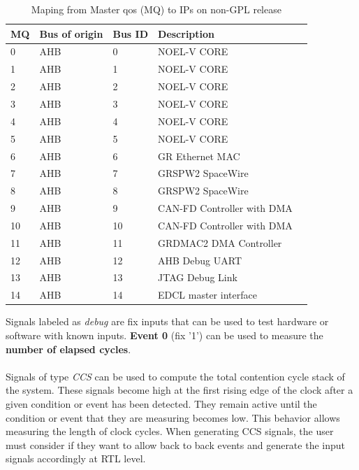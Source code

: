 \begin{table}[H]
	\caption{Maping from Master qos (MQ) to IPs on non-GPL release}
	\label{table:t_ev3}
	\centering
	\begin{tabular}{|l|l|l|l|l|}
		\hline
		\textbf{MQ} & \textbf{Bus of origin}  & \textbf{Bus ID} & \textbf{Description}\\
		\hline
0 & AHB & 0 &  NOEL-V CORE \\
1 & AHB & 1 &  NOEL-V CORE \\
2 & AHB & 2 &  NOEL-V CORE \\
3 & AHB & 3 &  NOEL-V CORE \\
4 & AHB & 4 &  NOEL-V CORE \\
5 & AHB & 5 &  NOEL-V CORE \\

6 & AHB & 6 &  GR Ethernet MAC \\
7 & AHB & 7 &  GRSPW2 SpaceWire \\
8 & AHB & 8 &  GRSPW2 SpaceWire \\
9 & AHB & 9 &  CAN-FD Controller with DMA \\
10 & AHB & 10 &  CAN-FD Controller with DMA \\
11 & AHB & 11 & GRDMAC2 DMA Controller \\
12 & AHB & 12 & AHB Debug UART  \\
13 & AHB & 13 & JTAG Debug Link   \\
14 & AHB & 14 & EDCL master interface  \\
	\hline
	\end{tabular}
\end{table}
Signals labeled as \textit{debug} are fix inputs that can be used to test hardware or software with known inputs. \textbf{Event 0} (fix '1') can be used to measure the \textbf{number of elapsed cycles}.\\
\\
Signals of type \textit{CCS} can be used to compute the total contention cycle stack of the system. These signals become high at the first rising edge of the clock after a given condition or event has been detected. They remain active until the condition or event that they are measuring becomes low. This behavior allows measuring the length of clock cycles. When generating CCS signals, the user must consider if they want to allow back to back events and generate the input signals accordingly at RTL level.


